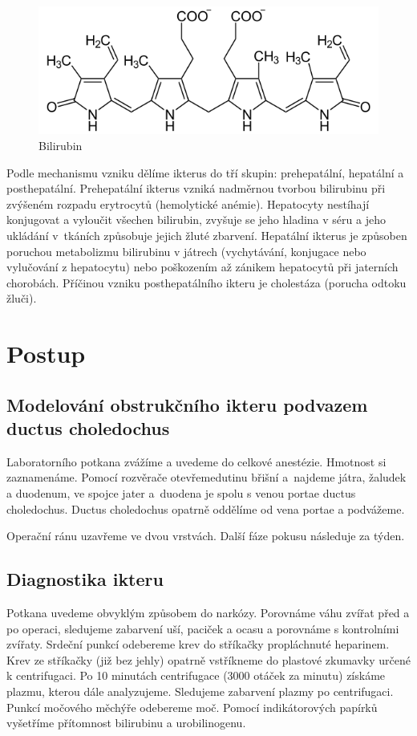 \documentclass[12pt]{article}
\begin{document}
\begin{figure}
	\begin{centering}
	\includegraphics[width=0.6\linewidth]{bilirubin.png}
	\caption{Bilirubin}
	\end{centering}
\end{figure}

Podle mechanismu vzniku dělíme ikterus do tří skupin: prehepatální, hepatální a posthepatální. Prehepatální ikterus vzniká nadměrnou tvorbou bilirubinu při zvýšeném rozpadu erytrocytů (hemolytické anémie). Hepatocyty nestíhají konjugovat a vyloučit všechen bilirubin, zvyšuje se jeho hladina v séru a jeho ukládání v~tkáních způsobuje jejich žluté zbarvení. Hepatální ikterus je způsoben poruchou metabolizmu bilirubinu v játrech (vychytávání, konjugace nebo vylučování z hepatocytu) nebo poškozením až zánikem hepatocytů při jaterních chorobách. Příčinou vzniku posthepatálního ikteru je cholestáza (porucha odtoku žluči).

\section{Postup}
\subsection{Modelování obstrukčního ikteru podvazem ductus choledochus}
Laboratorního potkana zvážíme a uvedeme do celkové anestézie. Hmotnost si zaznamenáme.  Pomocí rozvěrače otevřemedutinu břišní a~najdeme játra, žaludek a duodenum, ve spojce jater a~duodena je spolu s venou portae ductus choledochus. Ductus choledochus opatrně oddělíme od vena portae a podvážeme.

Operační ránu uzavřeme ve dvou vrstvách. Další fáze pokusu následuje za týden.

\subsection{Diagnostika ikteru}
Potkana uvedeme obvyklým způsobem do narkózy. Porovnáme váhu zvířat před a po operaci, sledujeme zabarvení uší, paciček a ocasu a porovnáme s kontrolními zvířaty. Srdeční punkcí odebereme krev do stříkačky propláchnuté heparinem. Krev ze stříkačky (již bez jehly) opatrně vstříkneme do plastové zkumavky určené k centrifugaci. Po 10 minutách centrifugace (3000 otáček za minutu) získáme plazmu, kterou dále analyzujeme. Sledujeme zabarvení plazmy po centrifugaci. Punkcí močového měchýře odebereme moč. Pomocí indikátorových papírků vyšetříme přítomnost bilirubinu a urobilinogenu.
\end{document}
